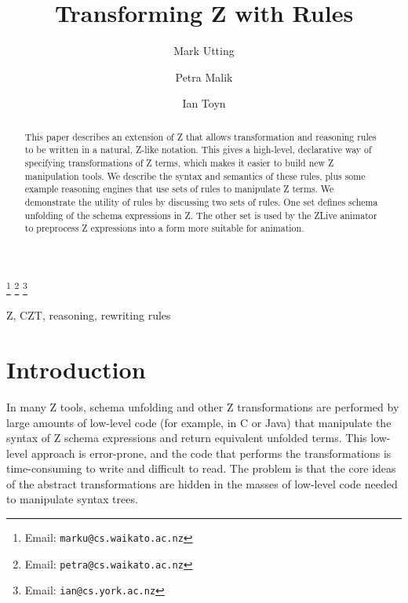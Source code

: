 \documentclass{entcs}
\begin{document}
\begin{frontmatter}
  \title{Transforming Z with Rules}
  \author{Mark Utting}
  \address{Department of Computer Science\\
    The University of Waikato\\
    Hamilton, New Zealand} 
  \author{Petra Malik}
  \address{Department of Computer Science\\
    The University of Waikato\\
    Hamilton, New Zealand} 
  \author{Ian Toyn}
  \address{Department of Computer Science\\
    The University of York\\
    Heslington, York, UK}
  \thanks[emailMark]{Email: \texttt{marku@cs.waikato.ac.nz}}
  \thanks[emailPetra]{Email: \texttt{petra@cs.waikato.ac.nz}}
  \thanks[emailIan]{Email: \texttt{ian@cs.york.ac.nz}}
\begin{abstract}
  This paper describes an extension of Z that allows transformation
  and reasoning rules to be written in a natural, Z-like notation.  This
  gives a high-level, declarative way of specifying transformations of Z
  terms, which makes it easier to build new Z manipulation tools.
  We describe the syntax and semantics of these rules, plus some example reasoning
  engines that use sets of rules to manipulate Z terms.  We demonstrate the
  utility of rules by discussing two sets of rules.  One set defines schema
  unfolding of the schema expressions in Z.  The other set is used by
  the ZLive animator to preprocess Z expressions into a form more suitable
  for animation.  
\end{abstract}
\begin{keyword}
  Z, CZT, reasoning, rewriting rules
\end{keyword}
\end{frontmatter}



\section{Introduction}

In many Z tools, schema unfolding and other Z transformations are performed
by large amounts of low-level code (for example, in C or Java) that
manipulate the syntax of Z schema expressions and return equivalent
unfolded terms.  This low-level approach is error-prone, and the code that
performs the transformations is time-consuming to write and difficult to
read.  The problem is that the core ideas of the abstract transformations are
hidden in the masses of low-level code needed to manipulate syntax trees.
\end{document}
